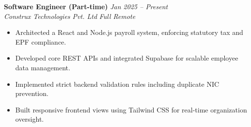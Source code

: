 \noindent
\textbf{Software Engineer (Part-time)} \hfill \textit{Jan 2025 -- Present}\\
\textit{Construx Technologies Pvt. Ltd} \hfill \textit{Full Remote}
\begin{itemize}[leftmargin=*, itemsep=0.05em, topsep=0.1em]
    \item Architected a React and Node.js payroll system, enforcing statutory tax and EPF compliance.
    \item Developed core REST APIs and integrated Supabase for scalable employee data management.
    \item Implemented strict backend validation rules including duplicate NIC prevention.
    \item Built responsive frontend views using Tailwind CSS for real-time organization oversight.
\end{itemize}

\vspace{0.4em} 
